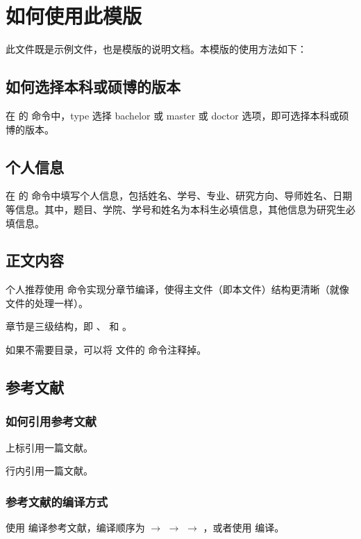 
\section{如何使用此模版}

此文件既是示例文件，也是模版的说明文档。本模版的使用方法如下：

\subsection{如何选择本科或硕博的版本}

在  的  命令中，type 选择 bachelor 或 master 或 doctor 选项，即可选择本科或硕博的版本。


\subsection{个人信息}

在  的  命令中填写个人信息，包括姓名、学号、专业、研究方向、导师姓名、日期等信息。其中，题目、学院、学号和姓名为本科生必填信息，其他信息为研究生必填信息。


\subsection{正文内容}

个人推荐使用  命令实现分章节编译，使得主文件（即本文件）结构更清晰（就像  文件的处理一样）。

章节是三级结构，即 、 和 。

如果不需要目录，可以将  文件的  命令注释掉。



\subsection{参考文献}

\subsubsection{如何引用参考文献}

上标引用一篇文献\cite{xdyy}。

行内引用一篇文献\parencite{xdyy}。


\subsubsection{参考文献的编译方式}

使用  编译参考文献，编译顺序为  $\to$  $\to$  $\to$ ，或者使用  编译。